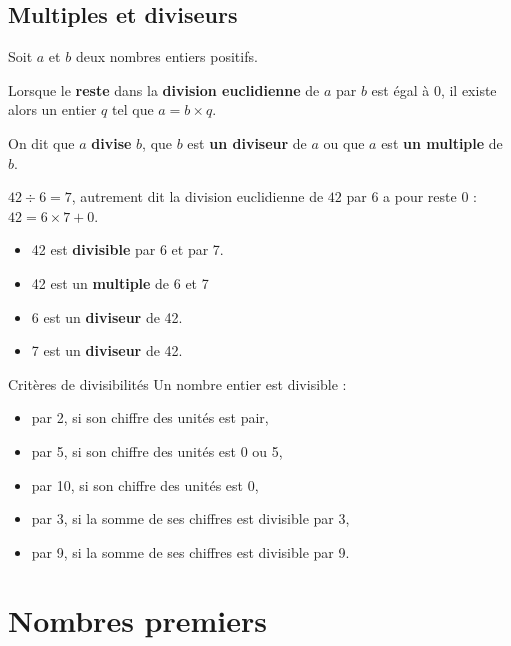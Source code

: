 \documentclass[a4paper,dvipsnames]{article}
\begin{document}
\begin{Mt}
\end{Mt}

\subsection{Multiples et diviseurs}

\begin{Def}
Soit $a$ et $b$ deux nombres entiers positifs.

Lorsque le \textbf{reste} dans la \textbf{division euclidienne} de $a$ par $b$ est égal à $0$, il existe alors un entier $q$ tel que $a=b\times q$.

On dit que $a$ \textbf{divise} $b$, que $b$ est \textbf{un diviseur} de $a$ ou que $a$ est \textbf{un multiple} de $b$.
\end{Def}

\begin{Ex}
\(42\div6=7\), autrement dit la division euclidienne de $42$ par $6$ a pour reste $0$ : \(42=6\times7+0\).\\

\begin{itemize}
    \item 42 est \textbf{divisible} par 6 et par 7.
    \item 42 est un \textbf{multiple} de 6 et 7
    \item 6 est un \textbf{diviseur} de 42.
    \item 7 est un \textbf{diviseur} de 42.
\end{itemize}
\end{Ex}

\begin{PpT}{Critères de divisibilités}
Un nombre entier est divisible :
\begin{itemize}
\item par 2, si son chiffre des unités est pair,
\item par 5, si son chiffre des unités est 0 ou 5,
\item par 10, si son chiffre des unités est 0,
\item par 3, si la somme de ses chiffres est divisible par 3,
\item par 9, si la somme de ses chiffres est divisible par 9.
\end{itemize}
\end{PpT}

\section{Nombres premiers}
\end{document}
